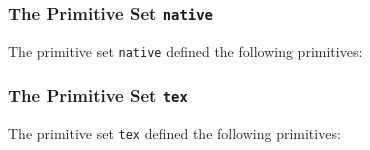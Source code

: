 \subsubsection{The Primitive Set \texttt{native}}

  The primitive set \texttt{native} defined the following primitives:

  \begin{primitives}
\end{primitives}
\subsubsection{The Primitive Set \texttt{tex}}

  The primitive set \texttt{tex} defined the following primitives:

